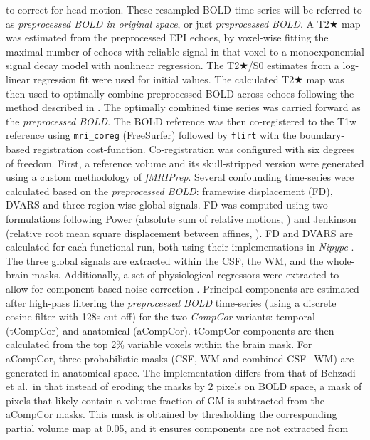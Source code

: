 \documentclass[
]{article}
\begin{document}
\begin{description}
to correct for head-motion. These resampled BOLD time-series will be
referred to as \emph{preprocessed BOLD in original space}, or just
\emph{preprocessed BOLD}. A T2★ map was estimated from the preprocessed
EPI echoes, by voxel-wise fitting the maximal number of echoes with
reliable signal in that voxel to a monoexponential signal decay model
with nonlinear regression. The T2★/S0 estimates from a log-linear
regression fit were used for initial values. The calculated T2★ map was
then used to optimally combine preprocessed BOLD across echoes following
the method described in \citep{posse_t2s}. The optimally combined time
series was carried forward as the \emph{preprocessed BOLD}. The BOLD
reference was then co-registered to the T1w reference using
\texttt{mri\_coreg} (FreeSurfer) followed by \texttt{flirt} \citep[FSL
6.0.5.1:57b01774,][]{flirt} with the boundary-based registration
\citep{bbr} cost-function. Co-registration was configured with six
degrees of freedom. First, a reference volume and its skull-stripped
version were generated using a custom methodology of \emph{fMRIPrep}.
Several confounding time-series were calculated based on the
\emph{preprocessed BOLD}: framewise displacement (FD), DVARS and three
region-wise global signals. FD was computed using two formulations
following Power (absolute sum of relative motions,
\citet{power_fd_dvars}) and Jenkinson (relative root mean square
displacement between affines, \citet{mcflirt}). FD and DVARS are
calculated for each functional run, both using their implementations in
\emph{Nipype} \citep[following the definitions by][]{power_fd_dvars}.
The three global signals are extracted within the CSF, the WM, and the
whole-brain masks. Additionally, a set of physiological regressors were
extracted to allow for component-based noise correction
\citep[\emph{CompCor},][]{compcor}. Principal components are estimated
after high-pass filtering the \emph{preprocessed BOLD} time-series
(using a discrete cosine filter with 128s cut-off) for the two
\emph{CompCor} variants: temporal (tCompCor) and anatomical (aCompCor).
tCompCor components are then calculated from the top 2\% variable voxels
within the brain mask. For aCompCor, three probabilistic masks (CSF, WM
and combined CSF+WM) are generated in anatomical space. The
implementation differs from that of Behzadi et al.~in that instead of
eroding the masks by 2 pixels on BOLD space, a mask of pixels that
likely contain a volume fraction of GM is subtracted from the aCompCor
masks. This mask is obtained by thresholding the corresponding partial
volume map at 0.05, and it ensures components are not extracted from

\end{description}
\end{document}
